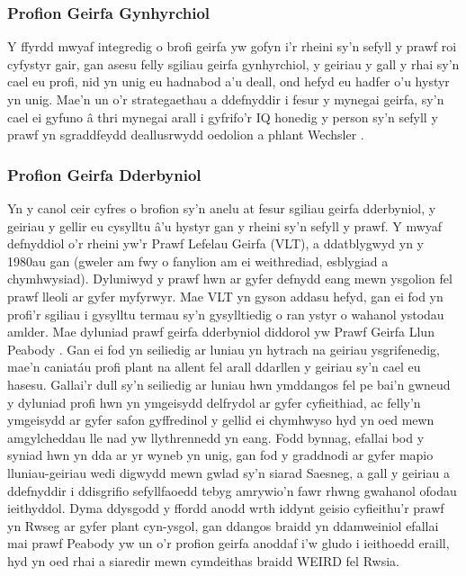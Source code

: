 \subsubsection{Profion Geirfa Gynhyrchiol}
Y ffyrdd mwyaf integredig o brofi geirfa yw gofyn i'r rheini sy'n sefyll y prawf roi cyfystyr gair, gan asesu felly sgiliau geirfa gynhyrchiol, y geiriau y gall y rhai sy'n cael eu profi, nid yn unig eu hadnabod a'u deall, ond hefyd eu hadfer o'u hystyr yn unig. Mae'n un o'r strategaethau a ddefnyddir i fesur y mynegai geirfa, sy'n cael ei gyfuno â thri mynegai arall i gyfrifo'r IQ honedig y person sy'n sefyll y prawf yn sgraddfeydd deallusrwydd oedolion a phlant Wechsler \parencite{wechsler_wechsler_nodate}.

\subsubsection{Profion Geirfa Dderbyniol}
Yn y canol ceir cyfres o brofion sy'n anelu at fesur sgiliau geirfa dderbyniol, y geiriau y gellir eu cysylltu â'u hystyr gan y rheini sy'n sefyll y prawf. Y mwyaf defnyddiol o'r rheini yw'r Prawf Lefelau Geirfa (VLT), a ddatblygwyd yn y 1980au gan \textcite{nation_teaching_1990} (gweler \cite{kremmel_vocabulary_2017} am fwy o fanylion am ei weithrediad, esblygiad a chymhwysiad). Dyluniwyd y prawf hwn ar gyfer defnydd eang mewn ysgolion fel prawf lleoli ar gyfer myfyrwyr. Mae VLT yn gyson addasu hefyd, gan ei fod yn profi'r sgiliau i gysylltu termau sy'n gysylltiedig o ran ystyr o wahanol ystodau amlder. Mae dyluniad prawf geirfa dderbyniol diddorol yw Prawf Geirfa Llun Peabody \parencite{dunn_ppvt-4_nodate}. Gan ei fod yn seiliedig ar luniau yn hytrach na geiriau ysgrifenedig, mae'n caniatáu profi plant na allent fel arall ddarllen y geiriau sy'n cael eu hasesu. Gallai'r dull sy'n seiliedig ar luniau hwn ymddangos fel pe bai'n gwneud y dyluniad profi hwn yn ymgeisydd delfrydol ar gyfer cyfieithiad, ac felly'n ymgeisydd ar gyfer safon gyffredinol y gellid ei chymhwyso hyd yn oed mewn amgylcheddau lle nad yw llythrennedd yn eang. Fodd bynnag, efallai bod y syniad hwn yn dda ar yr wyneb yn unig, gan fod y graddnodi ar gyfer mapio lluniau-geiriau wedi digwydd mewn gwlad sy'n siarad Saesneg, a gall y geiriau a ddefnyddir i ddisgrifio sefyllfaoedd tebyg amrywio'n fawr rhwng gwahanol ofodau ieithyddol. Dyma ddysgodd \textcite{kartushina_use_2022} y ffordd anodd wrth iddynt geisio cyfieithu'r prawf yn Rwseg ar gyfer plant cyn-ysgol, gan ddangos braidd yn ddamweiniol efallai mai prawf Peabody yw un o'r profion geirfa anoddaf i'w gludo i ieithoedd eraill, hyd yn oed rhai a siaredir mewn cymdeithas braidd WEIRD fel Rwsia.


